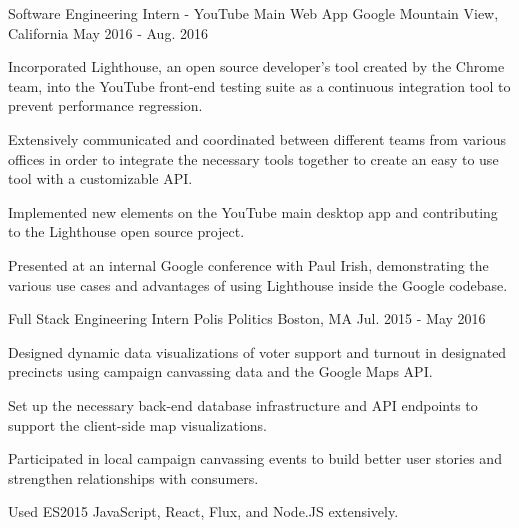 


\begin{cventries}


\cventry
{Software Engineering Intern - YouTube Main Web App} %
{Google} %
{Mountain View, California} %
{May 2016 - Aug. 2016} %
{ %
\begin{cvitems}
\item {Incorporated Lighthouse, an open
source developer's tool created by the Chrome team, into the YouTube front-end
testing suite as a continuous integration tool to prevent performance
regression.}
\item {Extensively communicated and coordinated between
different teams from various offices in order to integrate the necessary tools
together to create an easy to use tool with a customizable API.}
\item {Implemented new elements on the YouTube main desktop app
and contributing to the Lighthouse open source project.}
\item {Presented at an internal Google conference with Paul Irish, demonstrating the various use
cases and advantages of using Lighthouse inside the Google codebase.}
\end{cvitems}
}


\cventry
{Full Stack Engineering Intern} %
{Polis Politics} %
{Boston, MA} %
{Jul. 2015 - May 2016} %
{ %
\begin{cvitems}
\item{Designed dynamic data visualizations of voter support and turnout in
designated precincts using campaign canvassing data and the Google Maps API.}
\item {Set up the necessary back-end database infrastructure and API endpoints
to support the client-side map visualizations.}
\item {Participated in local campaign canvassing events to build better user
stories and strengthen relationships with consumers.}
\item {Used ES2015 JavaScript, React, Flux, and Node.JS extensively.}
\end{cvitems}
}


\end{cventries}
